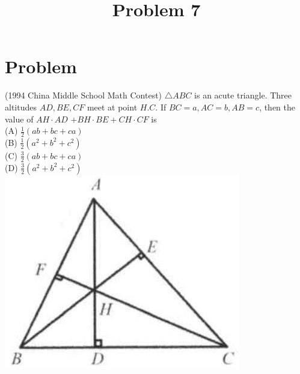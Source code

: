 \documentclass{article}
\title{Problem 7}
\date{}
\begin{document}
\maketitle

\section*{Problem}
(1994 China Middle School Math Contest) \(\triangle A B C\) is an acute triangle. Three altitudes \(A D, B E, C F\) meet at point \(H . C\). If \(B C=a, A C=b, A B=c\), then the value of \(A H \cdot A D\) \(+B H \cdot B E+C H \cdot C F\) is\\
(A) \(\frac{1}{2}(a b+b c+c a)\)\\
(B) \(\frac{1}{2}\left(a^{2}+b^{2}+c^{2}\right)\)\\
(C) \(\frac{3}{2}(a b+b c+c a)\)\\
(D) \(\frac{3}{2}\left(a^{2}+b^{2}+c^{2}\right)\)\\
\centering
\includegraphics[width=\textwidth]{images/207(1).jpg}
\end{document}
